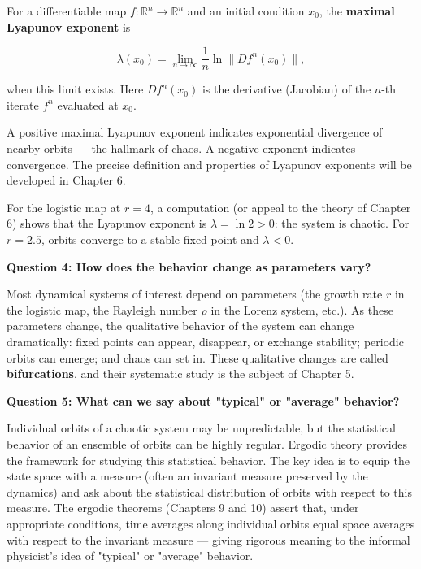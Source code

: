 \begin{definition}\label{def:1.7}
For a differentiable map $f: \mathbb{R}^n \to \mathbb{R}^n$ and an initial condition $x_0$, the \textbf{maximal Lyapunov exponent} is

\[
\lambda(x_0) = \lim_{n \to \infty} \frac{1}{n} \ln \|Df^n(x_0)\|,
\]

when this limit exists. Here $Df^n(x_0)$ is the derivative (Jacobian) of the $n$-th iterate $f^n$ evaluated at $x_0$.

A positive maximal Lyapunov exponent indicates exponential divergence of nearby orbits --- the hallmark of chaos. A negative exponent indicates convergence. The precise definition and properties of Lyapunov exponents will be developed in Chapter 6.

For the logistic map at $r = 4$, a computation (or appeal to the theory of Chapter 6) shows that the Lyapunov exponent is $\lambda = \ln 2 > 0$: the system is chaotic. For $r = 2.5$, orbits converge to a stable fixed point and $\lambda < 0$.

\textbf{Question 4: How does the behavior change as parameters vary?}

Most dynamical systems of interest depend on parameters (the growth rate $r$ in the logistic map, the Rayleigh number $\rho$ in the Lorenz system, etc.). As these parameters change, the qualitative behavior of the system can change dramatically: fixed points can appear, disappear, or exchange stability; periodic orbits can emerge; and chaos can set in. These qualitative changes are called \textbf{bifurcations}, and their systematic study is the subject of Chapter 5.

\textbf{Question 5: What can we say about "typical" or "average" behavior?}

Individual orbits of a chaotic system may be unpredictable, but the statistical behavior of an ensemble of orbits can be highly regular. Ergodic theory provides the framework for studying this statistical behavior. The key idea is to equip the state space with a measure (often an invariant measure preserved by the dynamics) and ask about the statistical distribution of orbits with respect to this measure. The ergodic theorems (Chapters 9 and 10) assert that, under appropriate conditions, time averages along individual orbits equal space averages with respect to the invariant measure --- giving rigorous meaning to the informal physicist's idea of "typical" or "average" behavior.
\end{definition}



